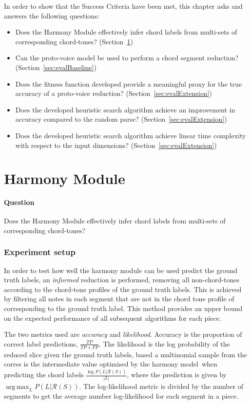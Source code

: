 \documentclass[12pt,a4paper,twoside,openany]{report} \usepackage[pdfborder={0 0 0}]{hyperref}    %
\DeclareMathOperator*{\argmax}{arg\,max} \DeclareMathOperator*{\argmin}{arg\,min}
\theoremstyle{definition} \newtheorem{definition}{Definition}[section]
\begin{document}
In order to show that the Success Criteria have been met, this chapter asks and answers the following questions: 
\begin{itemize} 
  \item Does the Harmony Module effectively infer chord labels from multi-sets of corresponding chord-tones? (Section~\ref{sec:evalHarmony})
  \item Can the proto-voice model be used to perform a chord segment reduction? (Section~\ref{sec:evalBaseline})
  \item Does the fitness function developed provide a meaningful proxy for the true accuracy of a proto-voice reduction?
    (Section~\ref{sec:evalExtension})
  \item Does the developed heuristic search algorithm achieve an improvement in accuracy compared to the random parse?
    (Section~\ref{sec:evalExtension})
  \item Does the developed heuristic search algorithm achieve linear time complexity with respect to the input
    dimensions? (Section~\ref{sec:evalExtension})
\end{itemize}

  \section{Harmony Module}
  \label{sec:evalHarmony}
  \paragraph{Question}{Does the Harmony Module effectively infer chord labels from multi-sets of corresponding
  chord-tones?}

  \subsubsection{Experiment setup}

  In order to test how well the harmony module can be used predict the ground truth labels, an \textit{informed} reduction is performed, removing all non-chord-tones according to the chord-tone profiles of the ground truth labels. 
  This is achieved by filtering all notes in each segment that are not in the chord tone profile of corresponding to the ground truth label. 
  This method provides an upper bound on the expected performance of all subsequent algorithms for each piece.

  The two metrics used are \textit{accuracy} and \textit{likelihood}. 
  Accuracy is the proportion of correct
  label predictions, $\frac{TP}{TP+FP}$. The likelihood is the log probability of the reduced slice given
  the ground truth labels, based a multinomial sample from the corres
  is the intermediate value optimised by the harmony model when
  predicting the chord labels $\frac{\log P(L|\mathcal{R}(S))}{|L|}$, where the prediction is given by $\argmax_L P(L|\mathcal{R}(S))$.
  The log-likelihood metric is divided by the number of segments to get the average number log-likelihood for each segment in a piece.
\end{document}
